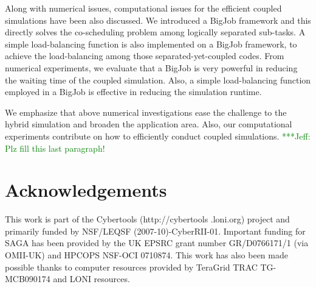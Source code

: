 \documentclass[preprint,12pt]{elsarticle}
\newcommand{\skonote}[1]{ {\textcolor{green} { ***Jeff: #1 }}}
\newcommand{\skonote}[1]{}
\begin{document}
Along with numerical issues, computational issues for the efficient coupled simulations have been also discussed. We introduced a BigJob framework and this directly solves the co-scheduling problem among logically separated sub-tasks. A simple load-balancing function is also implemented on a BigJob framework, to achieve the load-balancing among those separated-yet-coupled codes. From numerical experiments, we evaluate that a BigJob is very powerful in reducing the waiting time of the coupled simulation. Also, a simple load-balancing function employed in a BigJob is effective in reducing the simulation runtime.

We emphasize that above numerical investigations ease the challenge to the hybrid simulation and broaden the application area. Also, our computational experiments contribute on how to efficiently conduct coupled simulations.
\skonote{Plz fill this last paragraph!}

\section*{Acknowledgements}
This work is part of the Cybertools (http://cybertools .loni.org)
project and primarily funded by NSF/LEQSF (2007-10)-CyberRII-01.
Important funding for SAGA has been provided by the UK EPSRC grant
number GR/D0766171/1 (via OMII-UK) and HPCOPS NSF-OCI 0710874. This
work has also been made possible thanks to computer resources provided
by TeraGrid TRAC TG-MCB090174 and LONI resources.













\end{document}
